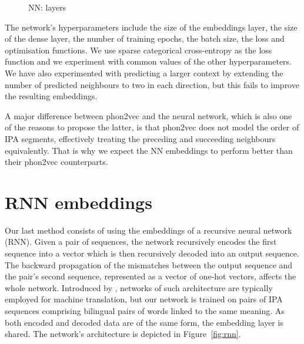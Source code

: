 \documentclass[a4paper]{report}
\begin{document}
\begin{figure}[h]
	\centering\small


	\caption{NN: layers}
	\label{fig:nn}
\end{figure}

The network's hyperparameters include the size of the embeddings layer, the size of the dense layer,
the number of training epochs, the batch size, the loss and optimisation functions.
We use sparse categorical cross-entropy as the loss function and we experiment with common values of the other hyperparameters.
We have also experimented with predicting a larger context by extending the number of predicted neighbours to two in each direction,
but this fails to improve the resulting embeddings.

A major difference between phon2vec and the neural network, which is also one of the reasons to propose the latter,
is that phon2vec does not model the order of IPA segments, effectively treating the preceding and succeeding neighbours equivalently.
That is why we expect the NN embeddings to perform better than their phon2vec counterparts.


\section{RNN embeddings}

Our last method consists of using the embeddings of a recursive neural network (RNN).
Given a pair of sequences, the network recursively encodes the first sequence into a vector which is then recursively decoded into an output sequence.
The backward propagation of the mismatches between the output sequence
and the pair's second sequence, represented as a vector of one-hot vectors, affects the whole network.
Introduced by \citet{2014_Cho_al}, networks of such architecture are typically employed for machine translation,
but our network is trained on pairs of IPA sequences comprising bilingual pairs of words linked to the same meaning.
As both encoded and decoded data are of the same form, the embedding layer is shared.
The network's architecture is depicted in Figure~\ref{fig:rnn}.
\end{document}
